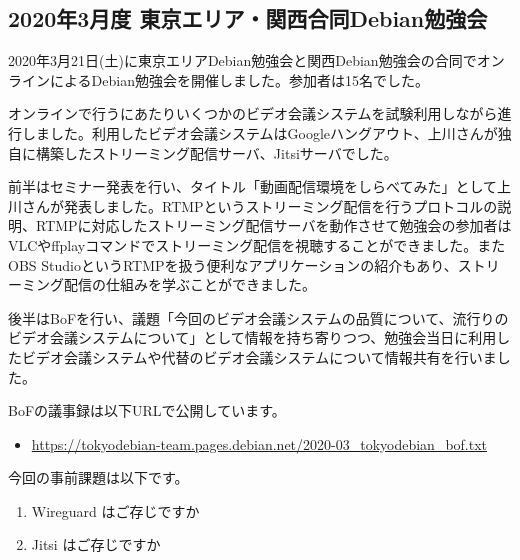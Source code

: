 \documentclass[mingoth,a4paper]{jsarticle}
\begin{document}

\subsection{2020年3月度 東京エリア・関西合同Debian勉強会}

2020年3月21日(土)に東京エリアDebian勉強会と関西Debian勉強会の合同でオンラインによるDebian勉強会を開催しました。参加者は15名でした。

オンラインで行うにあたりいくつかのビデオ会議システムを試験利用しながら進行しました。利用したビデオ会議システムはGoogleハングアウト、上川さんが独自に構築したストリーミング配信サーバ、Jitsiサーバでした。

前半はセミナー発表を行い、タイトル「動画配信環境をしらべてみた」として上川さんが発表しました。RTMPというストリーミング配信を行うプロトコルの説明、RTMPに対応したストリーミング配信サーバを動作させて勉強会の参加者はVLCやffplayコマンドでストリーミング配信を視聴することができました。またOBS StudioというRTMPを扱う便利なアプリケーションの紹介もあり、ストリーミング配信の仕組みを学ぶことができました。

後半はBoFを行い、議題「今回のビデオ会議システムの品質について、流行りのビデオ会議システムについて」として情報を持ち寄りつつ、勉強会当日に利用したビデオ会議システムや代替のビデオ会議システムについて情報共有を行いました。

BoFの議事録は以下URLで公開しています。

\begin{itemize}
\item \url{https://tokyodebian-team.pages.debian.net/2020-03_tokyodebian_bof.txt}
\end{itemize}



今回の事前課題は以下です。

\begin{enumerate}
\item Wireguard はご存じですか
\item Jitsi はご存じですか
\end{enumerate}


\begin{multicols}{2}
{\small

}
\end{multicols}

%
%
%
%
\end{document}
